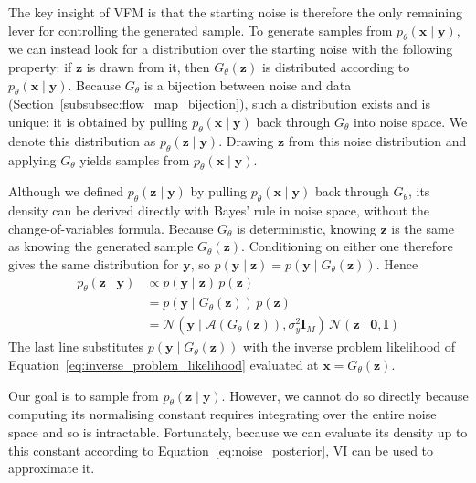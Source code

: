 \documentclass[12pt,a4paper]{report}
\begin{document}
The key insight of VFM \parencite{VFM} is that the starting noise is therefore the only remaining lever for controlling the generated sample. To generate samples from $p_{\theta}(\mathbf{x}\mid\mathbf{y})$, we can instead look for a distribution over the starting noise with the following property: if $\mathbf{z}$ is drawn from it, then $G_{\theta}(\mathbf{z})$ is distributed according to $p_{\theta}(\mathbf{x}\mid\mathbf{y})$. Because $G_{\theta}$ is a bijection between noise and data (Section~\ref{subsubsec:flow_map_bijection}), such a distribution exists and is unique: it is obtained by pulling $p_{\theta}(\mathbf{x}\mid\mathbf{y})$ back through $G_{\theta}$ into noise space. We denote this distribution as $p_{\theta}(\mathbf{z}\mid\mathbf{y})$. Drawing $\mathbf{z}$ from this noise distribution and applying $G_{\theta}$ yields samples from $p_{\theta}(\mathbf{x}\mid\mathbf{y})$.

Although we defined $p_{\theta}(\mathbf{z}\mid\mathbf{y})$ by pulling $p_{\theta}(\mathbf{x}\mid\mathbf{y})$ back through $G_{\theta}$, its density can be derived directly with Bayes' rule in noise space, without the change-of-variables formula. Because $G_{\theta}$ is deterministic, knowing $\mathbf{z}$ is the same as knowing the generated sample $G_{\theta}(\mathbf{z})$. Conditioning on either one therefore gives the same distribution for $\mathbf{y}$, so $p(\mathbf{y}\mid\mathbf{z})=p(\mathbf{y}\mid G_{\theta}(\mathbf{z}))$. Hence
\begin{align}
p_{\theta}(\mathbf{z}\mid\mathbf{y})
&\propto
p(\mathbf{y}\mid\mathbf{z})\,p(\mathbf{z})
\nonumber
\\
&=
p(\mathbf{y}\mid G_{\theta}(\mathbf{z}))\,p(\mathbf{z})
\nonumber
\\
&=
\mathcal{N}\left(\mathbf{y}\mid\mathcal{A}(G_{\theta}(\mathbf{z})),\sigma_y^2\mathbf{I}_{M}\right)
\,
\mathcal{N}\left(\mathbf{z}\mid\mathbf{0},\mathbf{I}\right)
\label{eq:noise_posterior}
\end{align}
The last line substitutes $p(\mathbf{y}\mid G_{\theta}(\mathbf{z}))$ with the inverse problem likelihood of Equation~\ref{eq:inverse_problem_likelihood} evaluated at $\mathbf{x}=G_{\theta}(\mathbf{z})$.

Our goal is to sample from $p_{\theta}(\mathbf{z}\mid\mathbf{y})$. However, we cannot do so directly because computing its normalising constant requires integrating over the entire noise space and so is intractable. Fortunately, because we can evaluate its density up to this constant according to Equation~\ref{eq:noise_posterior}, VI can be used to approximate it. 
\end{document}
